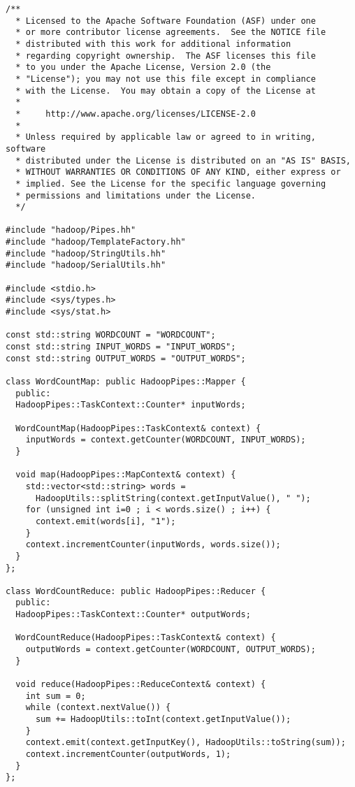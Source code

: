\documentclass[a4paper, 12pt]{article}
\begin{document}
\begin{appendices}
\begin{lstlisting}[style=cpp]
/**
  * Licensed to the Apache Software Foundation (ASF) under one
  * or more contributor license agreements.  See the NOTICE file
  * distributed with this work for additional information
  * regarding copyright ownership.  The ASF licenses this file
  * to you under the Apache License, Version 2.0 (the
  * "License"); you may not use this file except in compliance
  * with the License.  You may obtain a copy of the License at
  *
  *     http://www.apache.org/licenses/LICENSE-2.0
  *
  * Unless required by applicable law or agreed to in writing, software
  * distributed under the License is distributed on an "AS IS" BASIS,
  * WITHOUT WARRANTIES OR CONDITIONS OF ANY KIND, either express or
  * implied. See the License for the specific language governing
  * permissions and limitations under the License.
  */

#include "hadoop/Pipes.hh"
#include "hadoop/TemplateFactory.hh"
#include "hadoop/StringUtils.hh"
#include "hadoop/SerialUtils.hh"

#include <stdio.h>
#include <sys/types.h>
#include <sys/stat.h>

const std::string WORDCOUNT = "WORDCOUNT";
const std::string INPUT_WORDS = "INPUT_WORDS";
const std::string OUTPUT_WORDS = "OUTPUT_WORDS";

class WordCountMap: public HadoopPipes::Mapper {
  public:
  HadoopPipes::TaskContext::Counter* inputWords;

  WordCountMap(HadoopPipes::TaskContext& context) {
    inputWords = context.getCounter(WORDCOUNT, INPUT_WORDS);
  }

  void map(HadoopPipes::MapContext& context) {
    std::vector<std::string> words = 
      HadoopUtils::splitString(context.getInputValue(), " ");
    for (unsigned int i=0 ; i < words.size() ; i++) {
      context.emit(words[i], "1");
    }
    context.incrementCounter(inputWords, words.size());
  }
};

class WordCountReduce: public HadoopPipes::Reducer {
  public:
  HadoopPipes::TaskContext::Counter* outputWords;

  WordCountReduce(HadoopPipes::TaskContext& context) {
    outputWords = context.getCounter(WORDCOUNT, OUTPUT_WORDS);
  }

  void reduce(HadoopPipes::ReduceContext& context) {
    int sum = 0;
    while (context.nextValue()) {
      sum += HadoopUtils::toInt(context.getInputValue());
    }
    context.emit(context.getInputKey(), HadoopUtils::toString(sum));
    context.incrementCounter(outputWords, 1); 
  }
};


\end{lstlisting}
\end{appendices}
\end{document}
